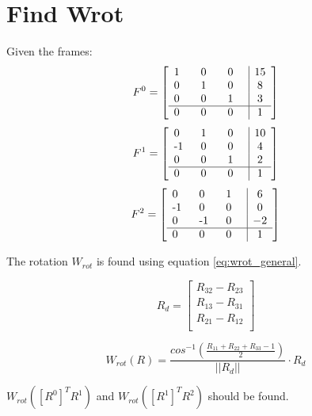 \section{Find Wrot}

Given the frames:
\[ 
F^0 = 
\left[
\begin{array}{*{3}{p{0.5cm}}|c}
    1 & 0 & 0 & 15 \\
    0 & 1 & 0 &  8 \\
    0 & 0 & 1 &  3 \\\hline
    0 & 0 & 0 &  1 \\
\end{array}
\right]
\]
\[ 
F^1 = 
\left[
\begin{array}{*{3}{p{0.5cm}}|c}
    0 & 1 & 0 & 10 \\
   -1 & 0 & 0 &  4 \\
    0 & 0 & 1 &  2 \\\hline
    0 & 0 & 0 &  1 \\
\end{array}
\right]
\]
\[ 
F^2 = 
\left[
\begin{array}{*{3}{p{0.5cm}}|c}
    0 & 0 & 1 &  6 \\
   -1 & 0 & 0 &  0 \\
    0 &-1 & 0 & -2 \\\hline
    0 & 0 & 0 &  1 \\
\end{array}
\right]
\]

The rotation \(W_{rot}\) is found using equation \ref{eq:wrot_general}. 

\begin{equation}
 R_d = 
 \left[ 
 \begin{array}{c}
  R_{32} - R_{23}\\
  R_{13} - R_{31}\\
  R_{21} - R_{12}\\
 \end{array}
 \right]
\end{equation}

\begin{equation}
 W_{rot}(R) = \frac{cos^{-1} \left( \frac{R_{11}+R_{22}+R_{33}-1}{2} \right) }{||R_d||} \cdot R_d \label{eq:wrot_general}
\end{equation}

\(W_{rot}(\left[R^0\right]^T R^1)\) and \(W_{rot}(\left[R^1\right]^T R^2)\) should be found.

